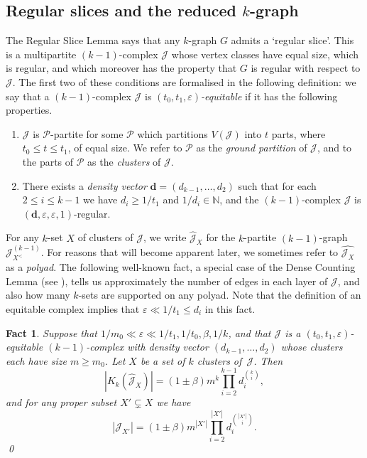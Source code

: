 \documentclass[12pt,a4paper]{amsart}
\def\itm#1{\rm ({#1})}
\def\itmit#1{\itm{\it #1\,}}
\def\abc{\itmit{\alph{*}}}
\let\eps\varepsilon
\newtheorem{fact}[theorem]{Fact}
\newcommand{\NATS}{\mathbb{N}}
\newcommand{\cJ}{\mathcal{J}}
\newcommand{\Part}{\mathcal{P}}
\begin{document}
\subsection{Regular slices and the reduced $k$-graph}\label{sec:rhgraph}
The Regular Slice Lemma says that any $k$-graph $G$ admits a
`regular slice'. This is a multipartite $(k-1)$-complex $\cJ$ whose vertex
classes have equal size, which is regular, and which moreover has the property that $G$ is regular with
respect to $\cJ$. The first two of these conditions are formalised in the
following definition: we say that a $(k-1)$-complex $\cJ$ is
\emph{$(t_0,t_1,\eps)$-equitable} if it has the following properties.
\begin{enumerate}[label=\abc]
  \item $\cJ$ is $\Part$-partite for some $\Part$ which partitions $V(\cJ)$ into
  $t$ parts, where $t_0\le t\le t_1$, of equal size. We
  refer to $\Part$ as the \emph{ground partition} of $\cJ$, and to the parts of $\Part$ as the
  \emph{clusters} of $\cJ$.
  \item There exists a \emph{density vector} $\mathbf{d}=(d_{k-1},\ldots,d_2)$
  such that for each $2\le i\le k-1$ we have $d_i\ge 1/t_1$ and
  $1/d_i\in\NATS$, and the $(k-1)$-complex $\cJ$ is $(\mathbf{d},\eps,\eps,1)$-regular.
\end{enumerate}
For any $k$-set $X$ of clusters of $\cJ$, we write $\hat{\cJ}_X$ for the
$k$-partite $(k-1)$-graph $\cJ^{(k-1)}_{X^<}$.
For reasons that will become apparent later, we sometimes refer to $\hat{\cJ_X}$ as a
\emph{polyad}.
The following well-known fact, a special case of the Dense Counting Lemma (see
\cite[Theorem 6.5]{KRS}), tells us approximately the number of edges in each
layer of $\cJ$, and also how many $k$-sets are supported on any polyad. Note that the definition of an equitable complex implies that $\eps\ll 1/t_1\le d_i$ in this fact.

\begin{fact} \label{fact:densecount} 
Suppose that $1/m_0 \ll \eps \ll 1/t_1, 1/t_0, \beta, 1/k$, and that
$\cJ$ is a $(t_0, t_1, \eps)$-equitable $(k-1)$-complex with density
vector $(d_{k-1}, \dots, d_2)$ whose clusters each have size $m \geq m_0$. Let $X$ be a set of
$k$ clusters of~$\cJ$. Then $$|K_k(\hat{\cJ}_X)| = (1 \pm \beta) m^k \prod_{i =
2}^{k-1} d_i^{\binom{k}{i}},$$ and for any proper subset $X' \subsetneq X$ we
have $$|\cJ_{X'}| = (1 \pm \beta) m^{|X'|} \prod_{i = 2}^{|X'|}
d_i^{\binom{|X'|}{i}}.$$ \qed
\end{fact}
\end{document}
